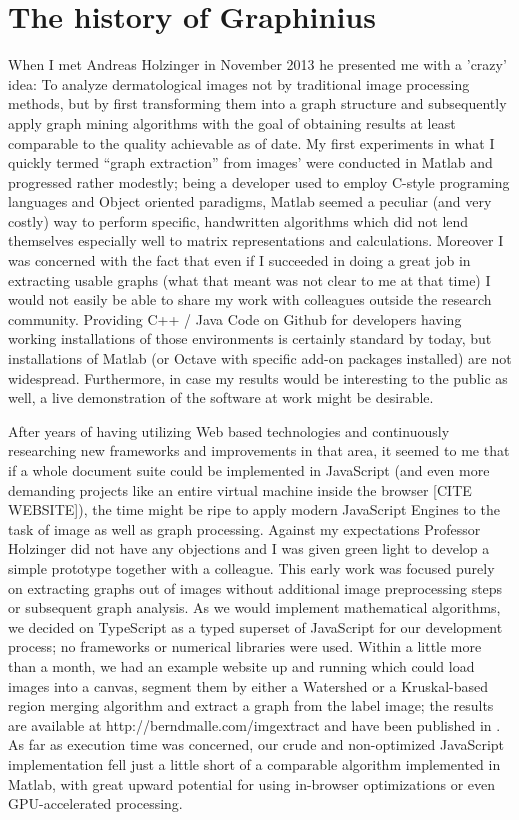 \section{The history of Graphinius}
\label{sect:ogma_history}
When I met Andreas Holzinger in November 2013 he presented me with a 'crazy' idea: To analyze dermatological images not by traditional image processing methods, but by first transforming them into a graph structure and subsequently apply graph mining algorithms with the goal of obtaining results at least comparable to the quality achievable as of date. My first experiments in what I quickly termed ``graph extraction'' from images' were conducted in Matlab and progressed rather modestly; being a developer used to employ C-style programing languages and Object oriented paradigms, Matlab seemed a peculiar (and very costly) way to perform specific, handwritten algorithms which did not lend themselves especially well to matrix representations and calculations. Moreover I was concerned with the fact that even if I succeeded in doing a great job in extracting usable graphs (what that meant was not clear to me at that time) I would not easily be able to share my work with colleagues outside the research community. Providing C++ / Java Code on Github for developers having working installations of those environments is certainly standard by today, but installations of Matlab (or Octave with specific add-on packages installed) are not widespread. Furthermore, in case my results would be interesting to the public as well, a live demonstration of the software at work might be desirable.

\par

After years of having utilizing Web based technologies and continuously researching new frameworks and improvements in that area, it seemed to me that if a whole document suite could be implemented in JavaScript (and even more demanding projects like an entire virtual machine inside the browser [CITE WEBSITE]), the time might be ripe to apply modern JavaScript Engines to the task of image as well as graph processing. Against my expectations Professor Holzinger did not have any objections and I was given green light to develop a simple prototype together with a colleague. This early work was focused purely on extracting graphs out of images without additional image preprocessing steps or subsequent graph analysis. As we would implement mathematical algorithms, we decided on TypeScript as a typed superset of JavaScript for our development process; no frameworks or numerical libraries were used. Within a little more than a month, we had an example website up and running which could load images into a canvas, segment them by either a Watershed or a Kruskal-based region merging algorithm and extract a graph from the label image; the results are available at http://berndmalle.com/imgextract and have been published in \cite{GraphExtractPaper}. As far as execution time was concerned, our crude and non-optimized JavaScript implementation fell just a little short of a comparable algorithm implemented in Matlab, with great upward potential for using in-browser optimizations or even GPU-accelerated processing.

